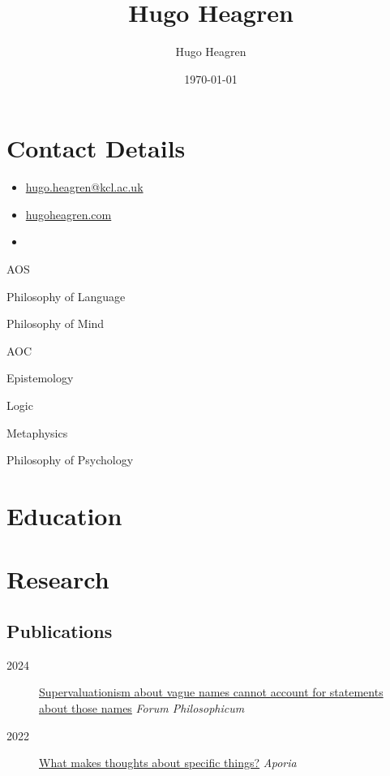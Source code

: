 \documentclass{cv}
\author{Hugo Heagren}
\date{\today}
\title{Hugo Heagren}
\begin{document}
\maketitle
\nocite{*}

\section*{Contact Details}
\begin{itemize}
\item \href{mailto:hugo.heagren@kcl.ac.uk}{hugo.heagren@kcl.ac.uk}
\item \href{https://hugoheagren.com}{hugoheagren.com}
\item {}
\end{itemize}

\begin{areas}
\item[{AOS}]%
  \begin{area}
  \item Philosophy of Language
  \item Philosophy of Mind
  \end{area}
\item[{AOC}]%
  \begin{area}
  \item Epistemology
  \item Logic
  \item Metaphysics
  \item Philosophy of Psychology
\end{area}
\end{areas}

\section*{Education}
\printbibliography[check=Education]{}

\section*{Research}
\subsection*{Publications}
\begin{description}
\item[{2024}] \href{https://dx.doi.org/10.35765/forphil.2024.2902.05}{Supervaluationism about vague names cannot account for statements about those names} \textit{Forum Philosophicum}
\item[{2022}] \href{https://ojs.st-andrews.ac.uk/index.php/aporia/article/view/2451}{What makes thoughts about specific things?} \textit{Aporia}
\end{description}
\end{document}
